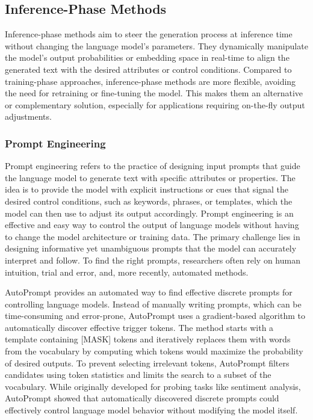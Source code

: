 \subsection{Inference-Phase Methods}
Inference-phase methods aim to steer the generation process at inference time without changing the language model's parameters.
They dynamically manipulate the model's output probabilities or embedding space in real-time to align the generated text with the desired attributes or control conditions.
Compared to training-phase approaches, inference-phase methods are more flexible, avoiding the need for retraining or fine-tuning the model.
This makes them an alternative or complementary solution, especially for applications requiring on-the-fly output adjustments.

\subsubsection{Prompt Engineering}
Prompt engineering refers to the practice of designing input prompts that guide the language model to generate text with specific attributes or properties. 
The idea is to provide the model with explicit instructions or cues that signal the desired control conditions, such as keywords, phrases, or templates, which the model can then use to adjust its output accordingly.
Prompt engineering is an effective and easy way to control the output of language models without having to change the model architecture or training data.
The primary challenge lies in designing informative yet unambiguous prompts that the model can accurately interpret and follow.
To find the right prompts, researchers often rely on human intuition, trial and error, and, more recently, automated methods.


AutoPrompt \cite{shin-etal-2020-autoprompt} provides an automated way to find effective discrete prompts for controlling language models. 
Instead of manually writing prompts, which can be time-consuming and error-prone, AutoPrompt uses a gradient-based algorithm to automatically discover effective trigger tokens. 
The method starts with a template containing [MASK] tokens and iteratively replaces them with words from the vocabulary by computing which tokens would maximize the probability of desired outputs. 
To prevent selecting irrelevant tokens, AutoPrompt filters candidates using token statistics and limits the search to a subset of the vocabulary. 
While originally developed for probing tasks like sentiment analysis, AutoPrompt showed that automatically discovered discrete prompts could effectively control language model behavior without modifying the model itself.

